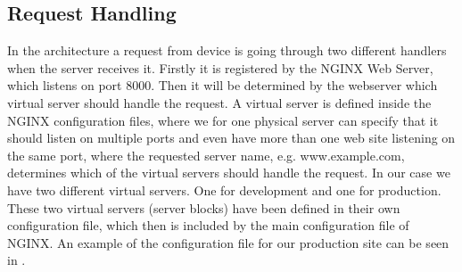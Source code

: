 \subsection{Request Handling}
\label{sub:request_handling}
In the architecture a request from device is going through two different handlers when the server receives it. Firstly it is registered by the NGINX Web Server, which listens on port 8000. Then it will be determined by the webserver which virtual server should handle the request. A virtual server is defined inside the NGINX configuration files, where we for one physical server can specify that it should listen on multiple ports and even have more than one web site listening on the same port, where the requested server name, e.g. www.example.com, determines which of the virtual servers should handle the request. In our case we have two different virtual servers. One for development and one for production. These two virtual servers (server blocks) have been defined in their own configuration file, which then is included by the main configuration file of NGINX. An example of the configuration file for our production site can be seen in . 


\FloatBarrier


